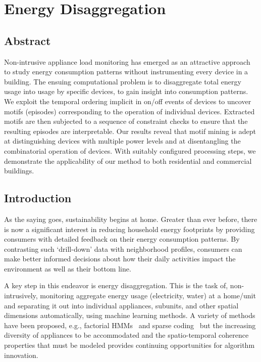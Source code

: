 \chapter{Energy Disaggregation}
\section{Abstract}
Non-intrusive appliance load monitoring has emerged as an attractive
approach to study energy consumption patterns without instrumenting every
device in a building.
The ensuing computational problem is to disaggregate
total energy usage into usage by specific
devices, to gain insight into consumption patterns. We exploit
the temporal ordering implicit in on/off events of devices to uncover motifs
(episodes) corresponding to the operation of individual devices. Extracted
motifs are then subjected to a sequence of constraint checks to ensure that
the resulting episodes are interpretable. Our results reveal that
motif mining is adept at distinguishing devices with multiple power levels
and at disentangling the combinatorial operation of devices. With suitably
configured processing steps, we demonstrate
the applicability of our method to both residential and commercial buildings.

%
\section{Introduction}
As the saying goes, sustainability begins at home. Greater than ever
before, there is now a significant interest in reducing household energy
footprints by providing consumers with detailed feedback
on their energy consumption patterns. By contrasting such `drill-down' data
with neighborhood profiles, consumers can make better informed decisions about
how their daily activities impact the environment as well as their bottom line.

A key step in this endeavor is energy disaggregation. This is the task of,
non-intrusively, monitoring aggregate energy usage  (electricity, water) at
a home/unit and separating it out into individual appliances, subunits, and
other spatial dimensions automatically, using machine learning methods.
A variety of methods have been proposed, e.g.,
factorial HMMs~\cite{kim2011unsupervised} and
sparse coding~\cite{kolter2012aistat}
but the increasing diversity of appliances to be accommodated and
the spatio-temporal coherence properties that must be
modeled provides continuing opportunities for algorithm innovation.

